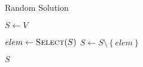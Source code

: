 \begin{algorithm}
  \caption{Random Solution}\label{alg:GENETIKUS-ALGORITMUS:RANDOM-SOLUTION}
  \begin{algorithmic}[1]
    \State $S \leftarrow V$

    \State $elem \leftarrow \Call{Select}{S}$
    \State $S \leftarrow S \setminus \left\{ elem \right\}$
    \EndWhile

    \State \Return $S$
    \EndFunction
  \end{algorithmic}
\end{algorithm}
